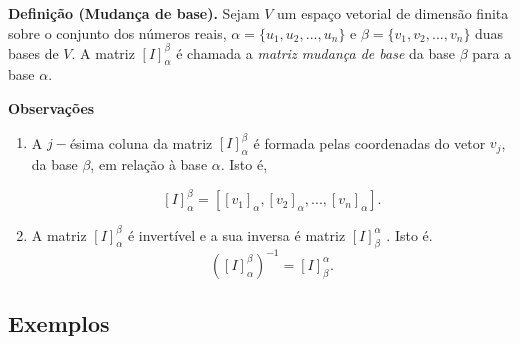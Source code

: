 \vspace{1cm}
\textbf{Definição (Mudança de base).} Sejam  $V$  um espaço vetorial de dimensão finita sobre o conjunto dos números reais, $\alpha=\{ u_1, u_2, ...,u_n\}$ e $\beta=\{v_1, v_2, ...,v_n\}$ duas bases de $V$. A matriz $[I]_{\alpha}^{\beta}$ é chamada  a \textit{matriz mudança de base} da base $\beta$ para a base $\alpha$.

\vspace{1cm}
\textbf{Observações}
\begin{enumerate}
 \item A $j-$ésima coluna da  matriz $[I]_{\alpha}^{\beta}$ é  formada pelas coordenadas do vetor $v_j$, da base $\beta$,  em relação à base $\alpha$. Isto é,

$$[I]_{\alpha}^{\beta}=\left[ [v_1]_{\alpha}, [v_2]_{\alpha} ,...,[v_n]_{\alpha}    \right].$$

\item  A matriz $[I]_{\alpha}^{\beta}$  é invertível e a sua inversa é matriz $[I]_{\beta}^{\alpha}$ . Isto é.
$$\left( [I]_{\alpha}^{\beta} \right)^{-1}=[I]_{\beta}^{\alpha}.$$
\end{enumerate}


\subsection{Exemplos}

